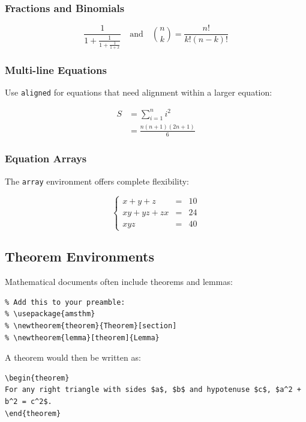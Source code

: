 \subsubsection{Fractions and Binomials}\label{subsubsec:fractions-binomials}
\[
\frac{1}{1 + \frac{1}{1 + \frac{1}{1 + x}}} \quad \text{and} \quad
\binom{n}{k} = \frac{n!}{k!(n-k)!}
\]

\subsubsection{Multi-line Equations}\label{subsubsec:multi-line-equations}
Use \texttt{aligned} for equations that need alignment within a larger equation:

\[
\begin{aligned}
S &= \sum_{i=1}^{n} i^2 \\
&= \frac{n(n+1)(2n+1)}{6}
\end{aligned}
\]

\subsubsection{Equation Arrays}\label{subsubsec:equation-arrays}
The \texttt{array} environment offers complete flexibility:

\[
\left\{
\begin{array}{rcl}
x + y + z &=& 10 \\
xy + yz + zx &=& 24 \\
xyz &=& 40
\end{array}
\right.
\]

\subsection{Theorem Environments}\label{subsec:theorem-environments}
Mathematical documents often include theorems and lemmas:

\begin{verbatim}
% Add this to your preamble:
% \usepackage{amsthm}
% \newtheorem{theorem}{Theorem}[section]
% \newtheorem{lemma}[theorem]{Lemma}
\end{verbatim}

A theorem would then be written as:

\begin{verbatim}
\begin{theorem}
For any right triangle with sides $a$, $b$ and hypotenuse $c$, $a^2 + b^2 = c^2$.
\end{theorem}
\end{verbatim}

